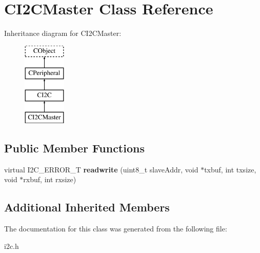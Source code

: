 \hypertarget{class_c_i2_c_master}{\section{C\-I2\-C\-Master Class Reference}
\label{class_c_i2_c_master}
}
Inheritance diagram for C\-I2\-C\-Master\-:\begin{figure}[H]
\begin{center}
\leavevmode
\includegraphics[height=4.000000cm]{class_c_i2_c_master}
\end{center}
\end{figure}
\subsection*{Public Member Functions}
\begin{DoxyCompactItemize}
\item 
\hypertarget{class_c_i2_c_master_aeea55afb38b9788048b5f7458616d208}{virtual I2\-C\-\_\-\-E\-R\-R\-O\-R\-\_\-\-T {\bfseries readwrite} (uint8\-\_\-t slave\-Addr, void $\ast$txbuf, int txsize, void $\ast$rxbuf, int rxsize)}\label{class_c_i2_c_master_aeea55afb38b9788048b5f7458616d208}

\end{DoxyCompactItemize}
\subsection*{Additional Inherited Members}


The documentation for this class was generated from the following file\-:\begin{DoxyCompactItemize}
\item 
i2c.\-h\end{DoxyCompactItemize}
